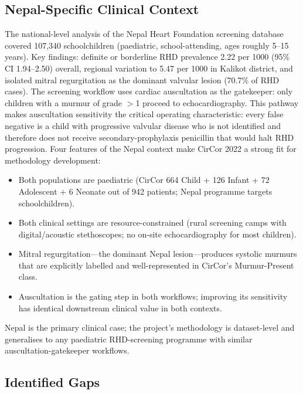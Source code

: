 \documentclass[10pt,twocolumn]{article}
\begin{document}
\subsection{Nepal-Specific Clinical Context}

The national-level analysis of the Nepal Heart Foundation screening database \citep{nepal_rhd2023} covered 107,340 schoolchildren (paediatric, school-attending, ages roughly 5--15 years). Key findings: definite or borderline RHD prevalence 2.22 per 1000 (95\% CI 1.94--2.50) overall, regional variation to 5.47 per 1000 in Kalikot district, and isolated mitral regurgitation as the dominant valvular lesion (70.7\% of RHD cases). The screening workflow uses cardiac auscultation as the gatekeeper: only children with a murmur of grade $>$1 proceed to echocardiography. This pathway makes auscultation sensitivity the critical operating characteristic: every false negative is a child with progressive valvular disease who is not identified and therefore does not receive secondary-prophylaxis penicillin that would halt RHD progression. Four features of the Nepal context make CirCor 2022 a strong fit for methodology development:
\begin{itemize}[leftmargin=*, itemsep=0.05em]
    \item Both populations are paediatric (CirCor 664 Child + 126 Infant + 72 Adolescent + 6 Neonate out of 942 patients; Nepal programme targets schoolchildren).
    \item Both clinical settings are resource-constrained (rural screening camps with digital/acoustic stethoscopes; no on-site echocardiography for most children).
    \item Mitral regurgitation---the dominant Nepal lesion---produces systolic murmurs that are explicitly labelled and well-represented in CirCor's Murmur-Present class.
    \item Auscultation is the gating step in both workflows; improving its sensitivity has identical downstream clinical value in both contexts.
\end{itemize}
Nepal is the primary clinical case; the project's methodology is dataset-level and generalises to any paediatric RHD-screening programme with similar auscultation-gatekeeper workflows.

\subsection{Identified Gaps}
\end{document}
